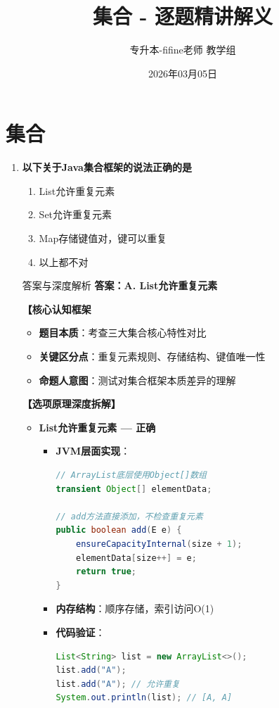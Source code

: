 \documentclass[12pt, a4paper]{ctexart}
\title{\textcolor{myblue}{\textbf{集合 - 逐题精讲解义}}}
\author{专升本-fifine老师 教学组}
\date{2026年03月05日}
\begin{document}
\maketitle
\thispagestyle{empty}
\newpage

\section{集合}

\begin{enumerate}[label=\textbf{\arabic*.}]

	\item \textbf{以下关于Java集合框架的说法正确的是}
	      \begin{enumerate}[label=\Alph*.]
		      \item List允许重复元素
		      \item Set允许重复元素
		      \item Map存储键值对，键可以重复
		      \item 以上都不对
	      \end{enumerate}

	      \begin{bluebox}{答案与深度解析}
		      \textbf{答案：A. List允许重复元素}

		      \textbf{【核心认知框架}
		      \begin{itemize}[label={}, leftmargin=*, nosep]
			      \item \textbf{题目本质}：考查三大集合核心特性对比
			      \item \textbf{关键区分点}：重复元素规则、存储结构、键值唯一性
			      \item \textbf{命题人意图}：测试对集合框架本质差异的理解
		      \end{itemize}

		      \textbf{【选项原理深度拆解】}

		      \begin{itemize}[leftmargin=*, nosep, label={}]
			      \item[A] \textbf{List允许重复元素 — 正确}
			            \begin{itemize}[label={}, leftmargin=*, nosep]
				            \item \textbf{JVM层面实现}：
				                  \begin{lstlisting}[language=Java]
// ArrayList底层使用Object[]数组
transient Object[] elementData;

// add方法直接添加，不检查重复元素
public boolean add(E e) {
    ensureCapacityInternal(size + 1);
    elementData[size++] = e;
    return true;
}
				      \end{lstlisting}
				            \item \textbf{内存结构}：顺序存储，索引访问O(1)
				            \item \textbf{代码验证}：
				                  \begin{lstlisting}[language=Java]
List<String> list = new ArrayList<>();
list.add("A");
list.add("A"); // 允许重复
System.out.println(list); // [A, A]
				      \end{lstlisting}
			            \end{itemize}


\end{itemize}
\end{bluebox}
\end{enumerate}
\end{document}
